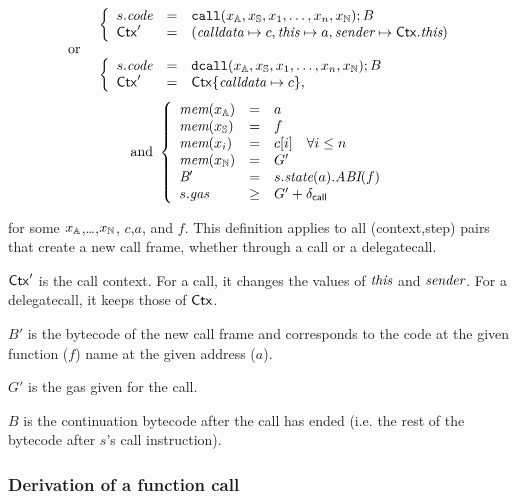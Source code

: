 $$
\begin{array}{ll}
&\left\{
    \begin{array}{lll}
    s.\textit{code} &=&  \mathtt{call}(x_{\mathbb{A}},x_{\mathbb{S}},x_1,\dots,x_n, x_{\mathbb{N}});B \\
    \mathsf{Ctx}' &=&(\textit{calldata}\mapsto c,
     \textit{this}\mapsto a,
     \textit{sender}\mapsto\mathsf{Ctx}.\textit{this})
    \end{array}\right.\\
\hbox{ or }&\\
&\left\{
    \begin{array}{lll}
    s.\textit{code} &=& \mathtt{dcall}(x_{\mathbb{A}},x_{\mathbb{S}},x_1,\dots,x_n, x_{\mathbb{N}});B \\
    \mathsf{Ctx}'&=&\mathsf{Ctx}\{\textit{calldata}\mapsto c\},
    \end{array}
    \right.
\end{array}
$$
$$
\begin{array}{cc}
\hbox{and }
\left\{
    \begin{array}{lll}
    \textit{mem}(x_{\mathbb{A}}) & = & a \\
    \textit{mem}(x_{\mathbb{S}}) & = & f \\
    \textit{mem}(x_i) & = & c[i]\quad \forall i\leq n \\
    \textit{mem}(x_{\mathbb{N}}) & = & G' \\
    \textit{B}{}' &=& s.\textit{state}(a).\textit{ABI}(f)\\
    s.\textit{gas} &\geq& G' + \delta_{\mathsf{call}}
    \end{array}\right.
\end{array}
$$

for some $x_{\mathbb{A}}$,\dots,$x_{\mathbb{N}}$, $c$,$a$, and $f$. This definition applies to all (context,step) pairs that create a new call frame, whether through a call or a delegatecall. 

$\mathsf{Ctx}'$ is the call context. For a call, it changes the values of $\textit{this}$ and $\textit{sender}$. For a delegatecall, it keeps those of $\mathsf{Ctx}$. 

$B'$ is the bytecode of the new call frame and corresponds to the code at the given function ($f$) name at the given address ($a$). 

$G'$ is the gas given for the call. 

$B$ is the continuation bytecode after the call has ended (i.e. the rest of the bytecode after $s$'s call instruction).

\subsubsection{Derivation of a function call}

